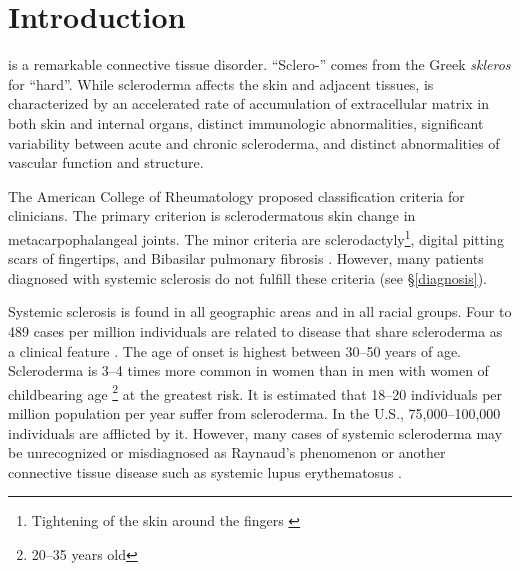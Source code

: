 \section{Introduction}

\SSc is a remarkable connective tissue disorder.  ``Sclero-'' comes from the
Greek \emph{skleros} for ``hard''. While scleroderma affects the skin and
adjacent tissues, \SSc is characterized by an accelerated rate of accumulation
of extracellular matrix in both skin and internal organs, distinct immunologic
abnormalities, significant variability between acute and chronic scleroderma,
and distinct abnormalities of vascular function and structure.

The American College of Rheumatology proposed \ssc classification criteria for
clinicians. The primary criterion is sclerodermatous skin change in
metacarpophalangeal joints. The minor criteria are sclerodactyly\footnote{
Tightening of the skin around the fingers \citep{dfnsclerodactyly}}, digital
pitting scars of fingertips, and Bibasilar pulmonary fibrosis
\citep[1211]{kelley}. However, many patients diagnosed with
systemic sclerosis do not fulfill these criteria (see \S\ref{diagnosis}).

Systemic sclerosis is found in all geographic areas and in all racial groups.
Four to 489 cases per million individuals are related to disease that share
scleroderma as a clinical feature \citep{overviewSSc}. The age of onset is
highest between 30--50 years of age. Scleroderma is 3--4 times more common in
women than in men with women of childbearing age \footnote{20--35 years old}
at the greatest risk. It is estimated that 18--20 individuals per million
population per year suffer from scleroderma. In the U.S., 75,000--100,000
individuals are afflicted by it.  However, many cases of systemic scleroderma
may be unrecognized or misdiagnosed as Raynaud's phenomenon or another
connective tissue disease such as systemic lupus erythematosus
\citep[1212]{kelley}.
